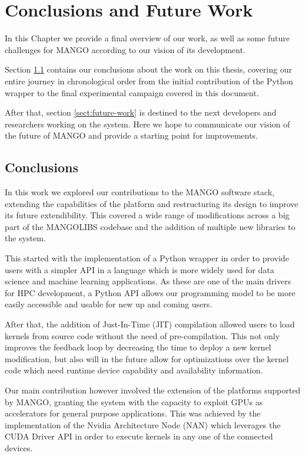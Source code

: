 \chapter{Conclusions and Future Work} \label{ch:Conclusions}

In this Chapter we provide a final overview of our work, as well as some future challenges for MANGO according to our vision of its development.

Section \ref{sect:conclusions} contains our conclusions about the work on this thesis, covering our entire journey in chronological order from the initial contribution of the Python wrapper to the final experimental campaign covered in this document.

After that, section \ref{sect:future-work} is destined to the next developers and researchers working on the system. Here we hope to communicate our vision of the future of MANGO and provide a starting point for improvements. 

\section{Conclusions} \label{sect:conclusions}

In this work we explored our contributions to the MANGO software stack, extending the capabilities of the platform and restructuring its design to improve its future extendibility. This covered a wide range of modifications across a big part of the MANGOLIBS codebase and the addition of multiple new libraries to the system.

This started with the implementation of a Python wrapper in order to provide users with a simpler API in a language which is more widely used for data science and machine learning applications. As these are one of the main drivers for HPC development, a Python API allows our programming model to be more easily accessible and usable for new up and coming users.

After that, the addition of Just-In-Time (JIT) compilation allowed users to load kernels from source code without the need of pre-compilation. This not only improves the feedback loop by decreasing the time to deploy a new kernel modification, but also will in the future allow for optimizations over the kernel code which need runtime device capability and availability information.

Our main contribution however involved the extension of the platforms supported by MANGO, granting the system with the capacity to exploit GPUs as accelerators for general purpose applications. This was achieved by the implementation of the Nvidia Architecture Node (NAN) which leverages the CUDA Driver API in order to execute kernels in any one of the connected devices. 

